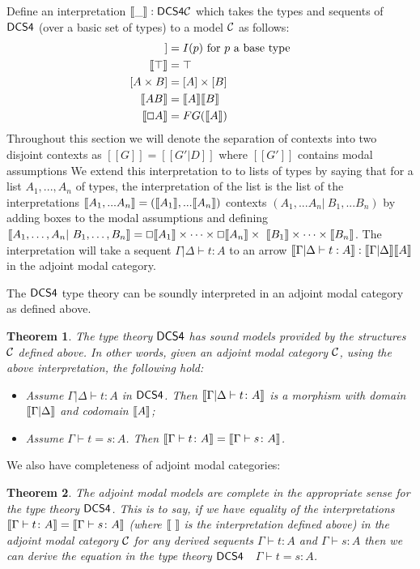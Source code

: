 \documentclass{article}
\let\to\relax
\newcommand{\to}{\rightarrow}
\renewcommand{\Box}{\oblong}
\def\sem#1{[\hspace{-0.05cm}[#1]\hspace{-0.05cm}]}
\newtheorem{theorem}{Theorem}
\begin{document}
\iffalse
Define an interpretation $\sem{\_} : \sf{DCS4} \to {\cal C}$ which takes the types and sequents of $\sf{DCS4}$ (over a basic 
set of types)  to a model $\cal C$ as follows:
\begin{align*}
\sem{p} &= I(p) \mbox{  for $p$ a base type}\\
\sem{\top} &= \top\\
[A\times B] &= [A]\times [B]\\
\sem{  A \to B  } &=  \sem{ A}  \to  \sem{ B }\\
\sem{\Box A} &= F G(\sem{A})
\end{align*}
 Throughout this section we will denote the separation of contexts
 into two disjoint contexts as $[[G]] = [[G' | D]]$ where $[[G']]$
 contains modal assumptions We extend this interpretation to to lists of types by saying
 that for a list $A_1, ..., A_n$ of types, the interpretation of the
 list is the list of the interpretations $\sem{A_1,...A_n} =
 (\sem{A_1}, . . . \sem{A_n})$ contexts $(A_1,...A_n | \ B_1,...B_n)$
 by adding boxes to the modal assumptions and defining $
 \sem{A_1,\ldots, A_n |\ B_1,\ldots,B_n} = \Box \sem{A_1}\times \cdots
 \times \Box \sem{A_n} \times \ \sem{B_1}\times \cdots \times\sem{B_n}
 $.  The interpretation will take a sequent $\Gamma|\Delta \vdash t :
 A$ to an arrow $ \sem {\Gamma|\Delta \vdash t : A} : \sem{
   \Gamma|\Delta} \to \sem{A} $ in the adjoint modal category.

The $\sf{DCS4}$ type theory can be soundly interpreted in an adjoint modal category as defined above.
\begin{theorem}
\label{thm:dcs4-sound}
The type theory $\sf{DCS4}$  has  \textit{sound} models provided by the structures $\cal C$ defined above.
In other words, given an adjoint modal category $\cal C$, using the above interpretation, the following hold:
\begin{itemize}
\item Assume $\Gamma|\Delta \vdash t : A$ in $\sf{DCS4}$. Then $\sem{\Gamma |
    \Delta \vdash t \colon A}$ is a morphism  with domain
  $\sem{\Gamma | \Delta}$ and codomain $\sem{A}$;
\item Assume $\Gamma \vdash t = s \colon A$. Then $\sem{\Gamma
  \vdash t \colon A} = \sem{\Gamma \vdash s \colon A}$.
\end{itemize}
\end{theorem}

We also have completeness of adjoint modal categories:
\begin{theorem}
\label{thm:diml-completeness}
The adjoint modal models are \textit{complete} in the appropriate sense for the type theory $\sf{DCS4}$. This is to say, if
we have equality of the interpretations $\sem{\Gamma \vdash t \colon A} = \sem{\Gamma  \vdash s \colon A}$
 (where \mbox{$\sem{\ } $} is the interpretation defined above)
 in the
adjoint modal category $\cal C$
   for any derived sequents $\Gamma \vdash t \colon A$
 and $\Gamma \vdash s \colon A$ 
 then we can derive the  equation in the type theory $\sf{DCS4}$ $\;$
 $\Gamma \vdash t = s \colon A$. 
\end{theorem}
\end{document}
